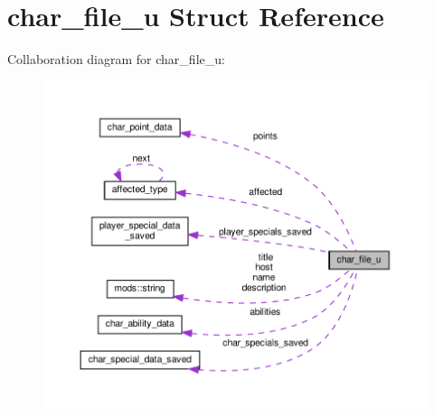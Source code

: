 \hypertarget{structchar__file__u}{}\section{char\+\_\+file\+\_\+u Struct Reference}
\label{structchar__file__u}


Collaboration diagram for char\+\_\+file\+\_\+u\+:
\nopagebreak
\begin{figure}[H]
\begin{center}
\leavevmode
\includegraphics[width=350pt]{structchar__file__u__coll__graph}
\end{center}
\end{figure}
